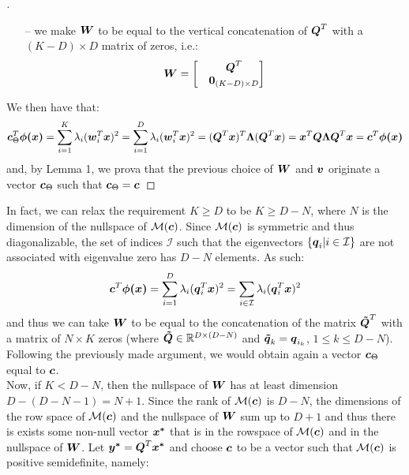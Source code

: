 \documentclass{exam}
\begin{document}
\begin{questions}
\begin{proof}[\unskip\nopunct]
\begin{itemize}
            \item[--] we make $\vb*{W}$ to be equal to the vertical concatenation of $\vb*{Q}^T$ with a $(K - D) \times D$ matrix of zeros, i.e.:
            \begin{align*}
            \vb*{W} = 
                \begin{bmatrix}
                    &\vb*{Q}^T \\
                    &\vb*{0}_{(K - D) \times D}
                \end{bmatrix}
            \end{align*}
        \end{itemize}
        We then have that:
        \[
            \vb*{c}^T_{\Theta} \vb*{\phi(x)} = \sum_{i = 1}^{K} \lambda_i (\vb*{w}_i^T\vb*{x})^2 =  \sum_{i = 1}^{D} \lambda_i (\vb*{w}_i^T\vb*{x})^2 = (\vb*{Q}^T \vb*{x})^T \vb*{\Lambda} (\vb*{Q}^T \vb*{x}) = \vb*{x}^T \vb*{Q} \vb*{\Lambda}\vb*{Q}^T \vb*{x} = \vb*{c}^T \vb*{\phi(x)}
        \]
        and, by Lemma 1, we prova that the previous choice of $\vb*{W}$ and $\vb*{v}$ originate a vector $\vb*{c}_{\Theta}$ such that $\vb*{c}_{\Theta} = \vb*{c}$
        \end{proof}
        In fact, we can relax the requirement $K \ge D$ to be $K \ge D - N$, where $N$ is the dimension of the nullspace of $\mathcal{M}(\vb*{c})$. Since $\mathcal{M}(\vb*{c})$ is symmetric and thus diagonalizable, the set of indices $\mathcal{I}$ such that the eigenvectors $\{\vb*{q}_i | i \in \mathcal{I}\}$ are not associated with eigenvalue zero has $D - N$ elements. As such:
        \[
            \vb*{c}^T \vb*{\phi(x)} = \sum_{i = 1}^{D} \lambda_i (\vb*{q}_i^T\vb*{x})^2 = \sum_{i \in \mathcal{I}} \lambda_i (\vb*{q}_i^T\vb*{x})^2
        \]
        and thus we can take $\vb*{W}$ to be equal to the concatenation of the matrix $\vb*{\tilde{Q}}^T$ with a matrix of $N \times K$ zeros (where $\vb*{\tilde{Q}} \in \mathbb{R}^{D \times (D - N)}$ and $\vb*{\tilde{q}}_k = \vb*{q}_{i_k}$, $1 \le k \le D - N$). Following the previously made argument, we would obtain again a vector $\vb*{c}_{\Theta}$ equal to $\vb*{c}$. \\
        Now, if $K < D - N$, then the nullspace of $\vb*{W}$ has at least dimension $D - (D - N - 1) = N + 1$. Since the rank of $\mathcal{M}(\vb*{c})$ is $D - N$, the dimensions of the row space of $\mathcal{M}(\vb*{c})$ and the nullspace of $\vb*{W}$ sum up to $D + 1$ and thus there is exists some non-null vector $\vb*{x^*}$ that is in the rowspace of $\mathcal{M}(\vb*{c})$ and in the nullspace of $\vb*{W}$. Let $\vb*{y^*} = \vb*{Q}^T \vb*{x^*}$ and choose $\vb*{c}$ to be a vector such that $\mathcal{M}(\vb*{c})$ is positive semidefinite, namely: 

\end{questions}
\end{document}
